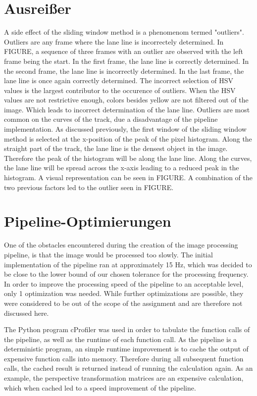 \documentclass[arbeit=studie,oneside,BCOR=12mm]{ArbeitRST}
\begin{document}
\section{Ausrei{\ss}er}
A side effect of the sliding window method is a phenomenom termed "outliers".
Outliers are any frame where the lane line is incorrectely determined. In
FIGURE, a sequence of three frames with an outlier are observed with the left
frame being the start. In the first frame, the lane line is correctly
determined. In the second frame, the lane line is incorrectly determined. In
the last frame, the lane line is once again correctly determined. 
The incorrect selection of HSV values is the largest contributor to the
occurence of outliers. When the HSV values are not restrictive enough, colors
besides yellow are not filtered out of the image. Which leads to incorrect
determination of the lane line.
Outliers are most common on the curves of the track, due a disadvantage of the
pipeline implementation. As discussed previously, the first window of the sliding
window method is selected at the x-position of the peak of the pixel histogram.
Along the straight part of the track, the lane line is the densest object in the 
image. Therefore the peak of the histogram will be along the lane line. Along 
the curves, the lane line will be spread across the x-axis leading to a reduced 
peak in the histogram. A visual representation can be seen in FIGURE. 
A combination of the two previous factors led to the outlier seen in FIGURE.




\section{Pipeline-Optimierungen}
One of the obstacles encountered during the creation of the image processing
pipeline, is that the image would be processed too slowly. 
The initial implementation of the pipeline ran at approximately 15 Hz, which was
decided to be close to the lower bound of our chosen tolerance for the 
processing frequency. 
In order to improve the processing speed of the pipeline to an acceptable level,
only 1 optimization was needed. 
While further optimizations are possible, they were considered to be out of the
scope of the assignment and are therefore not discussed here.

The Python program cProfiler was used in order to tabulate the function calls of
the pipeline, as well as the runtime of each function call. As the pipeline is a
deterministic program, an simple runtime improvement is to cache the output of 
expensive function calls into memory. Therefore during all subsequent function 
calls, the cached result is returned instead of running the calculation again. 
As an example, the perspective transformation matrices are an expensive 
calculation, which when cached led to a speed improvement of the pipeline.
\end{document}
